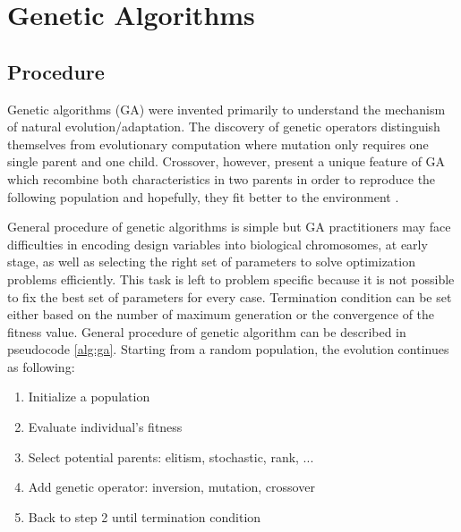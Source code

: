 \section{Genetic Algorithms}
\subsection*{Procedure}


Genetic algorithms (GA) were invented primarily to understand the mechanism of natural evolution/adaptation. The discovery of genetic operators distinguish themselves from evolutionary computation where mutation only requires one single parent and one child. Crossover, however, present a unique feature of GA which recombine both characteristics in two parents in order to reproduce the following population and hopefully, they fit better to the environment \cite{mitchell97}.

General procedure of genetic algorithms is simple but GA practitioners may face difficulties in encoding design variables into biological chromosomes, at early stage, as well as selecting the right set of parameters to solve optimization problems efficiently. This task is left to problem specific because it is not possible to fix the best set of parameters for every case. Termination condition can be set either based on the number of maximum generation or the convergence of the fitness value. General procedure of genetic algorithm can be described in pseudocode \ref{alg:ga}. Starting from a random population, the evolution continues as following: 
\begin{enumerate}%
\item Initialize a population
\item Evaluate individual's fitness
\item Select potential parents: elitism, stochastic, rank, ...
\item Add genetic operator: inversion, mutation, crossover
\item Back to step 2 until termination condition %
\end{enumerate}

